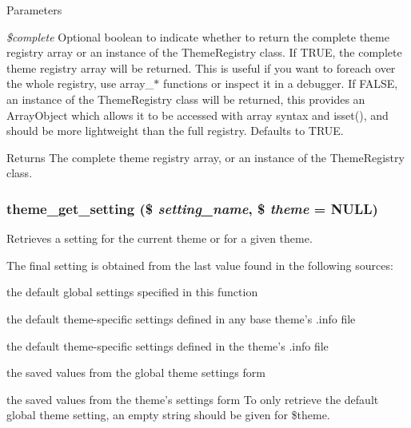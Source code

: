 \begin{DoxyParams}{Parameters}
\item[{\em \$complete}]Optional boolean to indicate whether to return the complete theme registry array or an instance of the ThemeRegistry class. If TRUE, the complete theme registry array will be returned. This is useful if you want to foreach over the whole registry, use array\_\-$\ast$ functions or inspect it in a debugger. If FALSE, an instance of the ThemeRegistry class will be returned, this provides an ArrayObject which allows it to be accessed with array syntax and isset(), and should be more lightweight than the full registry. Defaults to TRUE.\end{DoxyParams}
\begin{DoxyReturn}{Returns}
The complete theme registry array, or an instance of the ThemeRegistry class. 
\end{DoxyReturn}
\hypertarget{includes_2theme_8inc_a7cb0fd8d3be02b386d3bd88a3f1dcf1f}{
\subsubsection[{theme\_\-get\_\-setting}]{\setlength{\rightskip}{0pt plus 5cm}theme\_\-get\_\-setting (\$ {\em setting\_\-name}, \/  \$ {\em theme} = {\ttfamily NULL})}}
\label{includes_2theme_8inc_a7cb0fd8d3be02b386d3bd88a3f1dcf1f}
Retrieves a setting for the current theme or for a given theme.

The final setting is obtained from the last value found in the following sources:
\begin{DoxyItemize}
\item the default global settings specified in this function
\item the default theme-\/specific settings defined in any base theme's .info file
\item the default theme-\/specific settings defined in the theme's .info file
\item the saved values from the global theme settings form
\item the saved values from the theme's settings form To only retrieve the default global theme setting, an empty string should be given for \$theme.
\end{DoxyItemize}


